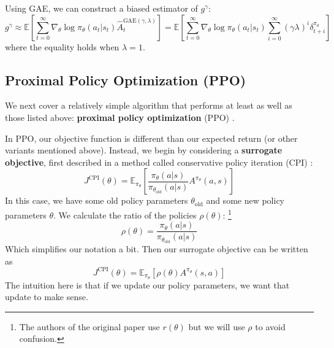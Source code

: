 \documentclass[journal, onecolumn, 12pt, draftclsnofoot]{IEEEtran}
\newcommand{\kword}[1]{\textbf{#1}}
\begin{document}
		\par Using GAE, we can construct a biased estimator of $g^\gamma$:
		\begin{equation}
			\label{eqn:g-gamma-estimate}
			g^\gamma \approx \mathbb{E} \left[ \sum_{t=0}^\infty \nabla_\theta \log \pi_\theta (a_t \big\vert s_t) \hat{A}_t^{\text{GAE}(\gamma, \lambda)} \right] = \mathbb{E} \left[ \sum_{t=0}^\infty \nabla_\theta \log \pi_\theta (a_t \big\vert s_t) \sum_{i=0}^\infty (\gamma \lambda)^i \delta_{t+i}^{\pi_\theta} \right]
		\end{equation}
		where the equality holds when $\lambda = 1$.
		\subsection{Proximal Policy Optimization (PPO)}
		\par We next cover a relatively simple algorithm that performs at least as well as those listed above: \kword{proximal policy optimization} (PPO) \cite{ppo}.
		\par In PPO, our objective function is different than our expected return (or other variants mentioned above). Instead, we begin by considering a \kword{surrogate objective}, first described in a method called conservative policy iteration (CPI) \cite{ppo}:
		\begin{equation}
			\label{eqn:CPI}
			J^{\text{CPI}}(\theta) = \mathbb{E}_{\pi_\theta} \left[ \frac{\pi_\theta (a \vert s)}{\pi_{\theta_\text{old}}(a \vert s)}A^{\pi_\theta}(a, s) \right]
		\end{equation}
		In this case, we have some old policy parameters $\theta_\text{old}$ and some new policy parameters $\theta$. We calculate the ratio of the policies $\rho (\theta)$: \footnote{The authors of the original paper use $r(\theta)$ but we will use $\rho$ to avoid confusion.}
		\begin{equation}
			\label{eqn:ratio-of-policies}
			\rho(\theta) = \frac{\pi_\theta (a \vert s)}{\pi_{\theta_\text{old}}(a \vert s)}
		\end{equation}
		Which simplifies our notation a bit. Then our surrogate objective can be written as
		\begin{equation}
			\label{eqn:CPI-using-rho}
			J^{\text{CPI}}(\theta) = \mathbb{E}_{\pi_\theta} \left[ \rho(\theta) A^{\pi_\theta}(s,a) \right]
		\end{equation}
		The intuition here is that if we update our policy parameters, we want that update to make sense.
\end{document}
